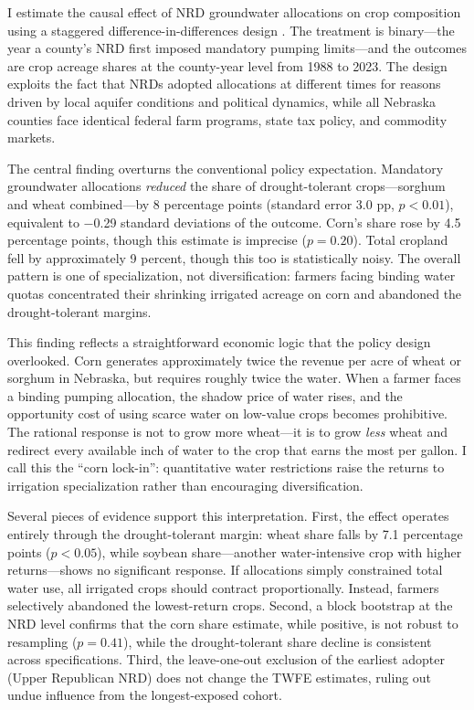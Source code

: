 \documentclass[12pt]{article}
\begin{document}
I estimate the causal effect of NRD groundwater allocations on crop composition using a staggered difference-in-differences design \citep{callaway2021difference}. The treatment is binary---the year a county's NRD first imposed mandatory pumping limits---and the outcomes are crop acreage shares at the county-year level from 1988 to 2023. The design exploits the fact that NRDs adopted allocations at different times for reasons driven by local aquifer conditions and political dynamics, while all Nebraska counties face identical federal farm programs, state tax policy, and commodity markets.

The central finding overturns the conventional policy expectation. Mandatory groundwater allocations \textit{reduced} the share of drought-tolerant crops---sorghum and wheat combined---by 8 percentage points (standard error 3.0 pp, $p < 0.01$), equivalent to $-$0.29 standard deviations of the outcome. Corn's share rose by 4.5 percentage points, though this estimate is imprecise ($p = 0.20$). Total cropland fell by approximately 9 percent, though this too is statistically noisy. The overall pattern is one of specialization, not diversification: farmers facing binding water quotas concentrated their shrinking irrigated acreage on corn and abandoned the drought-tolerant margins.

This finding reflects a straightforward economic logic that the policy design overlooked. Corn generates approximately twice the revenue per acre of wheat or sorghum in Nebraska, but requires roughly twice the water. When a farmer faces a binding pumping allocation, the shadow price of water rises, and the opportunity cost of using scarce water on low-value crops becomes prohibitive. The rational response is not to grow more wheat---it is to grow \textit{less} wheat and redirect every available inch of water to the crop that earns the most per gallon. I call this the ``corn lock-in'': quantitative water restrictions raise the returns to irrigation specialization rather than encouraging diversification.

Several pieces of evidence support this interpretation. First, the effect operates entirely through the drought-tolerant margin: wheat share falls by 7.1 percentage points ($p < 0.05$), while soybean share---another water-intensive crop with higher returns---shows no significant response. If allocations simply constrained total water use, all irrigated crops should contract proportionally. Instead, farmers selectively abandoned the lowest-return crops. Second, a block bootstrap at the NRD level confirms that the corn share estimate, while positive, is not robust to resampling ($p = 0.41$), while the drought-tolerant share decline is consistent across specifications. Third, the leave-one-out exclusion of the earliest adopter (Upper Republican NRD) does not change the TWFE estimates, ruling out undue influence from the longest-exposed cohort.
\end{document}
